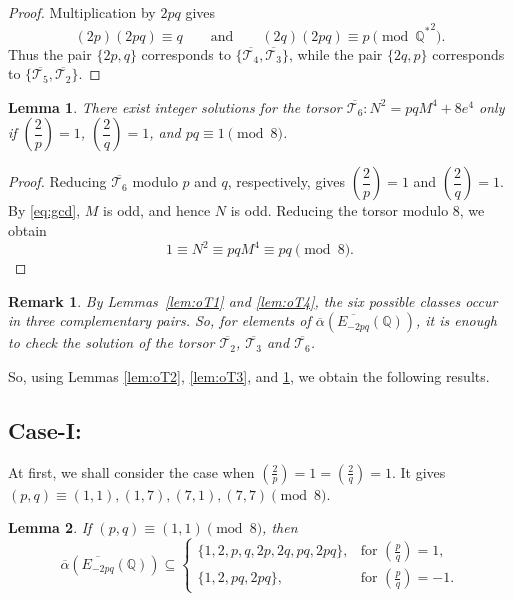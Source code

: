 \documentclass[12pt]{amsart}
\newcommand{\bbQ}{\mathbb{Q}}
\newcommand{\cT}{\mathcal{T}}
\newcommand{\legendre}[2]{\genfrac{(}{)}{}{}{#1}{#2}}
\numberwithin{equation}{section}
\newtheorem{rem}{Remark}[section]
\newtheorem{lem}{Lemma}[section]
\theoremstyle{definition}
\begin{document}
\begin{proof}
Multiplication by $2pq$ gives
\[
(2p)(2pq)\equiv q
\qquad\text{and}\qquad
(2q)(2pq)\equiv p
\pmod{{\bbQ^{*}}^{2}}.
\]
Thus the pair $\{2p,q\}$ corresponds to
$\{\overline{\cT_4},\overline{\cT_3}\}$, while the pair $\{2q,p\}$
corresponds to $\{\overline{\cT_5},\overline{\cT_2}\}$.
\end{proof}




\begin{lem}
    \label{lem:oT6}
There exist integer solutions for the torsor $\overline{\cT_{6}}: N^{2}=pqM^{4}+8e^{4}$ only if $\left( \dfrac{2}{p} \right)=1$, $\left(\dfrac{2}{q} \right) =1$, and $ pq \equiv 1 \pmod 8$.  
\end{lem}
\begin{proof}
Reducing $\overline{\cT_6}$ modulo $p$ and $q$, respectively, gives $
\left(\dfrac{2}{p}\right)=1$ and 
$
\left(\dfrac{2}{q}\right)=1.
$
By \eqref{eq:gcd}, $M$ is odd, and hence $N$ is odd. Reducing the torsor modulo
$8$, we obtain
\[
1\equiv N^{2}\equiv pqM^{4}\equiv pq\pmod 8.
\]
\end{proof}
\begin{rem}
    \label{rem:3.2} 
By Lemmas~\ref{lem:oT1} and \ref{lem:oT4}, the six possible classes occur in three complementary pairs. So, for elements of $\overline{\alpha} \left( \overline{E_{-2pq}}(\bbQ) \right)$, it is enough to check the solution of the torsor $\overline{\cT_{2}} $, $\overline{\cT_{3}}$ and $\overline{\cT_{6}}$. 
\end{rem}

So, using Lemmas \ref{lem:oT2}, \ref{lem:oT3}, and \ref{lem:oT6}, we obtain the following results.
\subsection*{Case-I:} At first, we shall consider the case when $\legendre{2}{p}=1=\legendre{2}{q}=1$. It gives $(p,q)\equiv (1,1),(1,7),(7,1),(7,7)\pmod 8$.


\begin{lem}
\label{lem:oalpha_1.1} 
If $(p,q)\equiv (1,1)\pmod 8$, then
\[
\overline{\alpha}\left(\overline{E_{-2pq}}(\bbQ)\right)\subseteq
\begin{cases}
\{1,2,p,q,2p,2q,pq,2pq\},
& \text{for } \legendre{p}{q}=1,\\
\{1,2,pq,2pq\},
& \text{for } \legendre{p}{q}=-1.
\end{cases}
\]
\end{lem}
\end{document}
